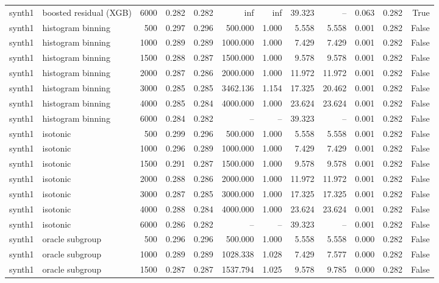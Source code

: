 \begin{tabular}{llrrrrrrrrrr}
synth1 & boosted residual (XGB) & 6000 & 0.282 & 0.282 & inf & inf & 39.323 & -- & 0.063 & 0.282 & True \\
synth1 & histogram binning & 500 & 0.297 & 0.296 & 500.000 & 1.000 & 5.558 & 5.558 & 0.001 & 0.282 & False \\
synth1 & histogram binning & 1000 & 0.289 & 0.289 & 1000.000 & 1.000 & 7.429 & 7.429 & 0.001 & 0.282 & False \\
synth1 & histogram binning & 1500 & 0.288 & 0.287 & 1500.000 & 1.000 & 9.578 & 9.578 & 0.001 & 0.282 & False \\
synth1 & histogram binning & 2000 & 0.287 & 0.286 & 2000.000 & 1.000 & 11.972 & 11.972 & 0.001 & 0.282 & False \\
synth1 & histogram binning & 3000 & 0.285 & 0.285 & 3462.136 & 1.154 & 17.325 & 20.462 & 0.001 & 0.282 & False \\
synth1 & histogram binning & 4000 & 0.285 & 0.284 & 4000.000 & 1.000 & 23.624 & 23.624 & 0.001 & 0.282 & False \\
synth1 & histogram binning & 6000 & 0.284 & 0.282 & -- & -- & 39.323 & -- & 0.001 & 0.282 & False \\
synth1 & isotonic & 500 & 0.299 & 0.296 & 500.000 & 1.000 & 5.558 & 5.558 & 0.001 & 0.282 & False \\
synth1 & isotonic & 1000 & 0.296 & 0.289 & 1000.000 & 1.000 & 7.429 & 7.429 & 0.001 & 0.282 & False \\
synth1 & isotonic & 1500 & 0.291 & 0.287 & 1500.000 & 1.000 & 9.578 & 9.578 & 0.001 & 0.282 & False \\
synth1 & isotonic & 2000 & 0.288 & 0.286 & 2000.000 & 1.000 & 11.972 & 11.972 & 0.001 & 0.282 & False \\
synth1 & isotonic & 3000 & 0.287 & 0.285 & 3000.000 & 1.000 & 17.325 & 17.325 & 0.001 & 0.282 & False \\
synth1 & isotonic & 4000 & 0.288 & 0.284 & 4000.000 & 1.000 & 23.624 & 23.624 & 0.001 & 0.282 & False \\
synth1 & isotonic & 6000 & 0.286 & 0.282 & -- & -- & 39.323 & -- & 0.001 & 0.282 & False \\
synth1 & oracle subgroup & 500 & 0.296 & 0.296 & 500.000 & 1.000 & 5.558 & 5.558 & 0.000 & 0.282 & False \\
synth1 & oracle subgroup & 1000 & 0.289 & 0.289 & 1028.338 & 1.028 & 7.429 & 7.577 & 0.000 & 0.282 & False \\
synth1 & oracle subgroup & 1500 & 0.287 & 0.287 & 1537.794 & 1.025 & 9.578 & 9.785 & 0.000 & 0.282 & False \\

\end{tabular}
